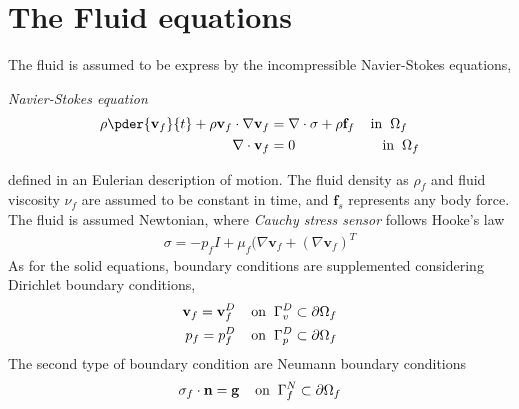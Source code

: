 \section{The Fluid equations}
\label{sec:fluidprob}
The fluid is assumed to be express by the incompressible Navier-Stokes equations,
\begin{equat}
\textit{Navier-Stokes equation}
\begin{align}
\rho \pder{\mathbf{v}_f}{t} + \rho \mathbf{v}_f \cdot \nabla \mathbf{v}_f &=
\nabla \cdot \sigma + \rho \mathbf{f}_f \hspace{4mm} \text{in} \hspace{2mm} \Omega_f \\
\nabla \cdot \mathbf{v}_f &= 0 \hspace{22mm} \text{in} \hspace{2mm} \Omega_f 
\end{align} 
\end{equat}
defined in an Eulerian description of motion. The fluid density as $\rho_f$ and fluid viscosity $\nu_f$  are assumed to be constant in time, and $\mathbf{f}_s$ represents any body force. 
The fluid is assumed Newtonian, where \textit{Cauchy stress sensor} follows Hooke's law
\begin{align*}
\sigma = -p_f I + \mu_f (\nabla \mathbf{v}_f + (\nabla \mathbf{v}_f)^T
\end{align*}
As for the solid equations, boundary conditions are supplemented considering  Dirichlet boundary conditions, 
\begin{align}
\mathbf{v}_f = \mathbf{v}_f^D 
\hspace{4mm} \text{on} \hspace{2mm} \Gamma_v^D \subset \partial \Omega_f \\
p_f = p_f^D 
\hspace{4mm} \text{on} \hspace{2mm} \Gamma_p^D \subset \partial \Omega_f
\end{align}
The second type of boundary condition are Neumann boundary conditions
\begin{align}
\sigma_f \cdot \mathbf{n} = \mathbf{g} 
\hspace{4mm} \text{on} \hspace{2mm} \Gamma_f^N \subset \partial \Omega_f 
\end{align}
